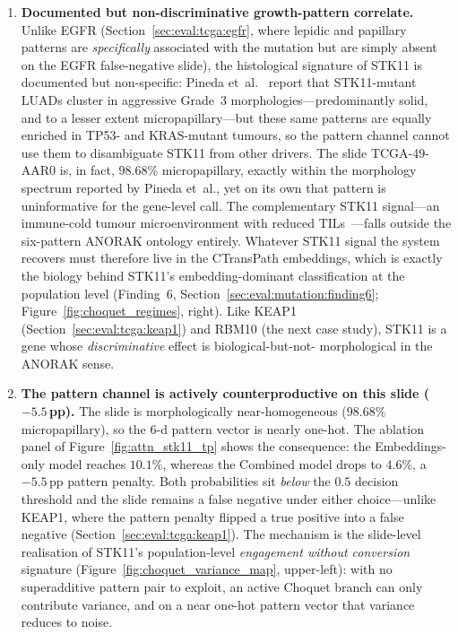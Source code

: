 \begin{enumerate}
    \item \textbf{Documented but non-discriminative
    growth-pattern correlate.}
    Unlike EGFR (Section~\ref{sec:eval:tcga:egfr}, where
    lepidic and papillary patterns are \emph{specifically}
    associated with the mutation but are simply absent on the
    EGFR false-negative slide), the histological signature of
    STK11 is documented but
    non-specific: Pineda et~al.~\cite{pineda2025stk11morphology}
    report that STK11-mutant LUADs cluster in aggressive
    Grade~3 morphologies---predominantly solid, and to a lesser
    extent micropapillary---but these same patterns are equally
    enriched in TP53- and KRAS-mutant tumours, so the pattern
    channel cannot use them to disambiguate STK11 from other
    drivers.
    The slide TCGA-49-AAR0 is, in fact,
    $98.68\%$ micropapillary, exactly within the morphology
    spectrum reported by Pineda et~al., yet on its own that
    pattern is uninformative for the gene-level call.
    The complementary STK11 signal---an immune-cold tumour
    microenvironment with reduced
    TILs~\cite{skoulidis2015krassubsets,skoulidis2018stk11pd1}---falls
    outside the six-pattern ANORAK ontology entirely.
    Whatever STK11 signal the system recovers must therefore
    live in the CTransPath embeddings, which is exactly the
    biology behind STK11's embedding-dominant classification at
    the population level
    (Finding~6, Section~\ref{sec:eval:mutation:finding6};
    Figure~\ref{fig:choquet_regimes}, right).
    Like KEAP1 (Section~\ref{sec:eval:tcga:keap1}) and RBM10
    (the next case study), STK11 is a gene whose
    \emph{discriminative} effect is biological-but-not-%
    morphological in the ANORAK sense.

    \item \textbf{The pattern channel is actively
    counterproductive on this slide ($-5.5$\,pp).}
    The slide is morphologically near-homogeneous
    ($98.68\%$ micropapillary), so the 6-d pattern vector is
    nearly one-hot.
    The ablation panel of Figure~\ref{fig:attn_stk11_tp} shows
    the consequence: the Embeddings-only model reaches
    $10.1\%$, whereas the Combined model drops to $4.6\%$, a
    $-5.5$\,pp pattern penalty.
    Both probabilities sit \emph{below} the $0.5$ decision
    threshold and the slide remains a false negative under
    either choice---unlike KEAP1, where the pattern penalty
    flipped a true positive into a false negative
    (Section~\ref{sec:eval:tcga:keap1}).
    The mechanism is the slide-level realisation of STK11's
    population-level \emph{engagement without conversion}
    signature
    (Figure~\ref{fig:choquet_variance_map}, upper-left): with
    no superadditive pattern pair to exploit, an active Choquet
    branch can only contribute variance, and on a near one-hot
    pattern vector that variance reduces to noise.


\end{enumerate}
